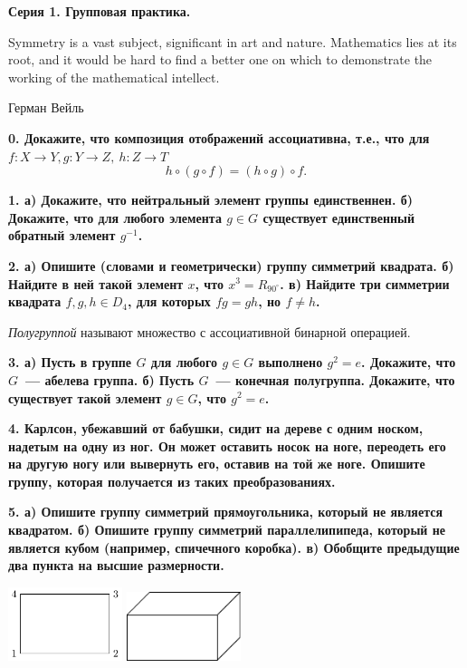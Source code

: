 \documentclass[10pt]{article}
\begin{document}
	\begin{landscape}

	\pagestyle{empty}
	\begin{multicols}{2}

	\centerline{\bf{Серия 1. Групповая практика. }}

	\epigraph{Symmetry is a vast subject, significant in art and nature. Mathematics lies at its root, and it would be hard to find a better one on which to demonstrate the working of the mathematical intellect.}{Герман Вейль}

	\bf{0.} Докажите, что композиция отображений ассоциативна, т.е., что для $f \colon X \to Y, g \colon Y \to Z, \ h \colon Z \to T$
	\[
		h \circ (g \circ f) = (h \circ g) \circ f.
	\]

	\bf{1.} а) Докажите, что нейтральный элемент группы единственнен. б) Докажите, что для любого элемента $g \in G$ существует единственный обратный элемент $g^{-1}$. 

	\bf{2.} а) Опишите (словами и геометрически) группу симметрий квадрата. б) Найдите в ней такой элемент $x$, что $x^3 = R_{90^{\circ}}$. в) Найдите три симметрии квадрата $f, g, h \in D_{4}$, для которых $fg = gh$, но $f \neq h$.

	\begin{definition} 
		\emph{Полугруппой} называют множество с ассоциативной бинарной операцией. 
	\end{definition}

	\bf{3.} а)  Пусть в группе $G$ для любого $g \in G$ выполнено $g^2 = e$. Докажите, что $G$~--- абелева группа.  б) Пусть $G$~--- конечная полугруппа. Докажите, что существует такой элемент $g \in G$, что $g^2 = e$.

	\bf{4.} Карлсон, убежавший от бабушки, сидит на дереве с одним носком, надетым на одну из ног. Он может оставить носок на ноге, переодеть его на другую ногу или вывернуть его, оставив на той же ноге. Опишите группу, которая получается из таких преобразованиях. 

	\bf{5.} а) Опишите группу симметрий прямоугольника, который не является квадратом. б) Опишите группу симметрий параллелипипеда, который не является кубом (например, спичечного коробка). в) Обобщите предыдущие два пункта на высшие размерности. 

	\begin{center}
	\begin{minipage}{6in}
		\includegraphics[width=0.25\textwidth]{pic/pic_1.pdf}
		\hspace{10mm}
		\includegraphics[width=0.25\textwidth]{pic/pic_2.pdf}
	\end{minipage}
	\end{center}



\end{multicols}
\end{landscape}
\end{document}
